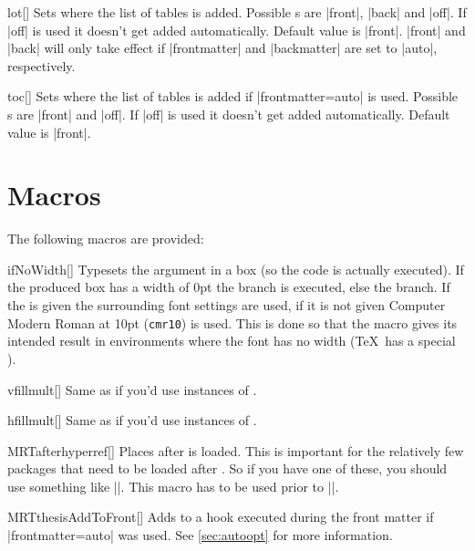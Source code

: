 \begin{describeopt}{lot}[]
  Sets where the list of tables is added. Possible s are |front|,
  |back| and |off|. If |off| is used it doesn't get added automatically. Default
  value is |front|. |front| and |back| will only take effect if |frontmatter|
  and |backmatter| are set to |auto|, respectively.
\end{describeopt}
\begin{describeopt}{toc}[]
  Sets where the list of tables is added if |frontmatter=auto| is used. Possible
  s are |front| and |off|. If |off| is used it doesn't get added
  automatically. Default value is |front|.
\end{describeopt}

\section{Macros}\label{sec:thesis:mac}%
The following macros are provided:
\begin{describemacroTF}{ifNoWidth}[\meta{*}]
  Typesets the argument in a box (so the code is actually executed). If the
  produced box has a width of 0pt the  branch is executed, else the
   branch. If the \meta{*} is given the surrounding font settings
  are used, if it is not given Computer Modern Roman at 10pt (\texttt{cmr10}) is
  used. This is done so that the macro gives its intended result in environments
  where the font has no width (\TeX\ has a special ).
\end{describemacroTF}
\begin{describemacro}{vfillmult}[]
  Same as if you'd use  instances of .
\end{describemacro}
\begin{describemacro}{hfillmult}[]
  Same as if you'd use  instances of .
\end{describemacro}
\begin{describemacro}{MRTafterhyperref}[]
  Places  after  is loaded. This is important for
  the relatively few packages that need to be loaded after . So if
  you have one of these, you should use something like
  \bverb|\MRTafterhyperref{\usepackage{cleveref}}|. This macro has to be used
  prior to \bverb||.
\end{describemacro}
\begin{describemacro}{MRTthesisAddToFront}[]
  Adds  to a hook executed during the front matter if
  \bverb|frontmatter=auto| was used. See \autoref{sec:autoopt} for more
  information.
\end{describemacro}
